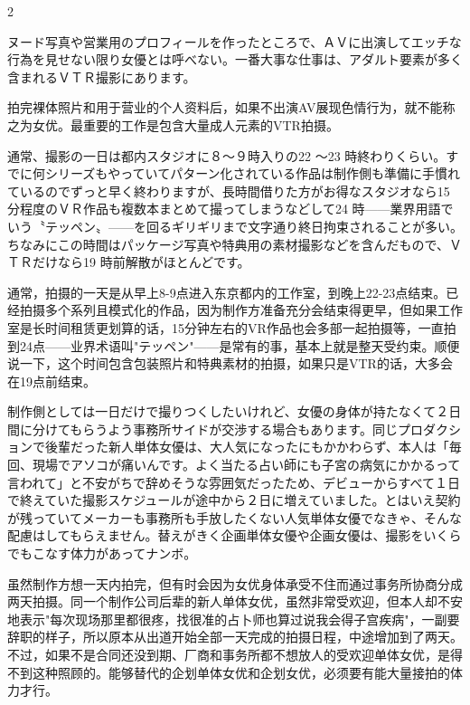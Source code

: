 \documentclass[12pt,UTF8]{ctexbook}
\begin{document}
\begin{paracol}{2}

ヌード写真や営業用のプロフィールを作ったところで、ＡＶに出演してエッチな行為を見せない限り女優とは呼べない。一番大事な仕事は、アダルト要素が多く含まれるＶＴＲ撮影にあります。

\switchcolumn

拍完裸体照片和用于营业的个人资料后，如果不出演AV展现色情行为，就不能称之为女优。最重要的工作是包含大量成人元素的VTR拍摄。

\switchcolumn*

通常、撮影の一日は都内スタジオに８〜９時入りの22 〜23 時終わりくらい。すでに何シリーズもやっていてパターン化されている作品は制作側も準備に手慣れているのでずっと早く終わりますが、長時間借りた方がお得なスタジオなら15 分程度のＶＲ作品も複数本まとめて撮ってしまうなどして24 時——業界用語でいう〝テッペン〟——を回るギリギリまで文字通り終日拘束されることが多い。ちなみにこの時間はパッケージ写真や特典用の素材撮影などを含んだもので、ＶＴＲだけなら19 時前解散がほとんどです。

\switchcolumn

通常，拍摄的一天是从早上8-9点进入东京都内的工作室，到晚上22-23点结束。已经拍摄多个系列且模式化的作品，因为制作方准备充分会结束得更早，但如果工作室是长时间租赁更划算的话，15分钟左右的VR作品也会多部一起拍摄等，一直拍到24点——业界术语叫"テッペン"——是常有的事，基本上就是整天受约束。顺便说一下，这个时间包含包装照片和特典素材的拍摄，如果只是VTR的话，大多会在19点前结束。

\switchcolumn*

制作側としては一日だけで撮りつくしたいけれど、女優の身体が持たなくて２日間に分けてもらうよう事務所サイドが交渉する場合もあります。同じプロダクションで後輩だった新人単体女優は、大人気になったにもかかわらず、本人は「毎回、現場でアソコが痛いんです。よく当たる占い師にも子宮の病気にかかるって言われて」と不安がちで辞めそうな雰囲気だったため、デビューからすべて１日で終えていた撮影スケジュールが途中から２日に増えていました。とはいえ契約が残っていてメーカーも事務所も手放したくない人気単体女優でなきゃ、そんな配慮はしてもらえません。替えがきく企画単体女優や企画女優は、撮影をいくらでもこなす体力があってナンボ。

\switchcolumn

虽然制作方想一天内拍完，但有时会因为女优身体承受不住而通过事务所协商分成两天拍摄。同一个制作公司后辈的新人单体女优，虽然非常受欢迎，但本人却不安地表示"每次现场那里都很疼，找很准的占卜师也算过说我会得子宫疾病"，一副要辞职的样子，所以原本从出道开始全部一天完成的拍摄日程，中途增加到了两天。不过，如果不是合同还没到期、厂商和事务所都不想放人的受欢迎单体女优，是得不到这种照顾的。能够替代的企划单体女优和企划女优，必须要有能大量接拍的体力才行。


\end{paracol}
\end{document}
